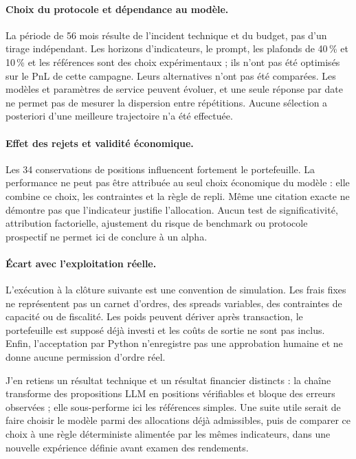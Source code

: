\paragraph*{Choix du protocole et dépendance au modèle.}
La période de 56 mois résulte de l'incident technique et du budget, pas d'un tirage indépendant. Les horizons d'indicateurs, le prompt, les plafonds de 40\,\% et 10\,\% et les références sont des choix expérimentaux ; ils n'ont pas été optimisés sur le PnL de cette campagne. Leurs alternatives n'ont pas été comparées. Les modèles et paramètres de service peuvent évoluer, et une seule réponse par date ne permet pas de mesurer la dispersion entre répétitions. Aucune sélection a posteriori d'une meilleure trajectoire n'a été effectuée.

\paragraph*{Effet des rejets et validité économique.}
Les 34 conservations de positions influencent fortement le portefeuille. La performance ne peut pas être attribuée au seul choix économique du modèle : elle combine ce choix, les contraintes et la règle de repli. Même une citation exacte ne démontre pas que l'indicateur justifie l'allocation. Aucun test de significativité, attribution factorielle, ajustement du risque de benchmark ou protocole prospectif ne permet ici de conclure à un alpha.

\paragraph*{Écart avec l'exploitation réelle.}
L'exécution à la clôture suivante est une convention de simulation. Les frais fixes ne représentent pas un carnet d'ordres, des spreads variables, des contraintes de capacité ou de fiscalité. Les poids peuvent dériver après transaction, le portefeuille est supposé déjà investi et les coûts de sortie ne sont pas inclus. Enfin, l'acceptation par Python n'enregistre pas une approbation humaine et ne donne aucune permission d'ordre réel.

J'en retiens un résultat technique et un résultat financier distincts : la chaîne transforme des propositions LLM en positions vérifiables et bloque des erreurs observées ; elle sous-performe ici les références simples. Une suite utile serait de faire choisir le modèle parmi des allocations déjà admissibles, puis de comparer ce choix à une règle déterministe alimentée par les mêmes indicateurs, dans une nouvelle expérience définie avant examen des rendements.
